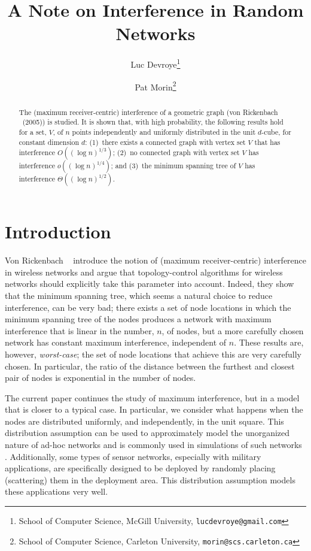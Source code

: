 \documentclass{cccg12}
\title{A Note on Interference in Random Networks}
\author{Luc Devroye\thanks{School of Computer Science, McGill University,
       {\tt lucdevroye@gmail.com}}
        \and
        Pat Morin\thanks{School of Computer Science, Carleton University,
       {\tt morin@scs.carleton.ca}}}
\begin{document}
\maketitle

\begin{abstract}
  The (maximum receiver-centric) interference of a geometric graph
  (von Rickenbach \etal\ (2005)) is studied.  It is shown that,
  with high probability, the following results hold for a set, $V$,
  of $n$ points independently and uniformly distributed in the unit
  $d$-cube, for constant dimension $d$: (1)~there exists a connected
  graph with vertex set $V$ that has interference $O((\log n)^{1/3})$;
  (2)~no connected graph with vertex set $V$ has interference $o((\log
  n)^{1/4})$; and (3)~the minimum spanning tree of $V$ has interference
  $\Theta((\log n)^{1/2})$.
\end{abstract}

\section{Introduction}

Von Rickenbach \etal\ \cite{vR05,rwz09} introduce the notion of (maximum
receiver-centric) interference in wireless networks and argue that
topology-control algorithms for wireless networks should explicitly take
this parameter into account.  Indeed, they show that the minimum spanning
tree, which seems a natural choice to reduce interference, can be very
bad; there exists a set of node locations in which the minimum spanning
tree of the nodes produces a network with maximum interference that is
linear in the number, $n$, of nodes, but a more carefully chosen network
has constant maximum interference, independent of $n$.  These results are,
however, \emph{worst-case}; the set of node locations that achieve this
are very carefully chosen.  In particular, the ratio of the distance
between the furthest and closest pair of nodes is exponential in the
number of nodes.

The current paper continues the study of maximum interference, but in a
model that is closer to a typical case.  In particular, we consider what
happens when the nodes are distributed uniformly, and independently,
in the unit square.  This distribution assumption can be used to
approximately model the unorganized nature of ad-hoc networks and is
commonly used in simulations of such networks \cite{tma09}. Additionally, some
types of sensor networks, especially with military applications, are
specifically designed to be deployed by randomly placing (scattering)
them in the deployment area. This distribution assumption models these
applications very well.
\end{document}
